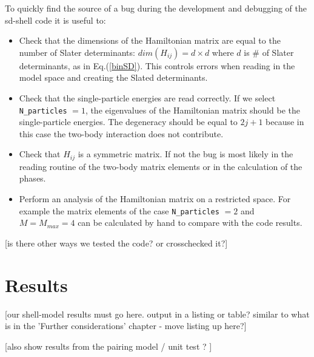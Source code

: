 \documentclass[twoside]{article}
\begin{document}
To quickly find the source of a bug during the development and debugging of the sd-shell code it is useful to:
\begin{itemize}
\item Check that the dimensions of the Hamiltonian matrix are equal to the number of Slater determinants: $dim(H_{ij})=d \times d$ where $d$ is $\#$ of Slater determinants, as in Eq.(\ref{binSD}). This controls errors when reading in the model space and creating the Slated determinants.
\item Check that the single-particle energies are read correctly. If we select \texttt{N\_particles} $=1$, the eigenvalues of the Hamiltonian matrix should be the single-particle energies. The degeneracy should be equal to $2j+1$ because in this case the two-body interaction does not contribute.
\item Check that $H_{ij}$ is a symmetric matrix. If not the bug is most likely in the reading routine of the two-body matrix elements or in the calculation of the phases.
\item Perform an analysis of the Hamiltonian matrix on a restricted space. For example the matrix elements of the case \texttt{N\_particles} $=2$ and $M=M_{max}=4$ can be calculated by hand to compare with the code results.
\end{itemize}


[is there other ways we tested the code? or crosschecked it?]



\section{Results}

[our shell-model results must go here. output in a listing or table? similar to what is in the 'Further considerations' chapter - move listing up here?]

[also show results from the pairing model / unit test ? ]

\end{document}
